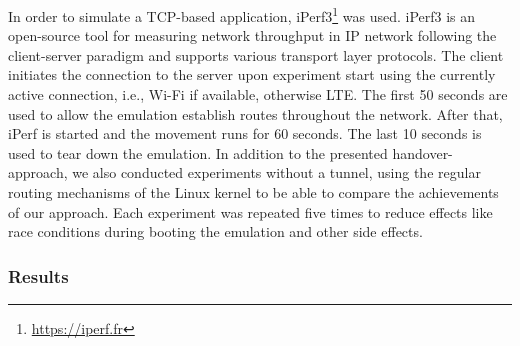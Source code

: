 In order to simulate a TCP-based application, iPerf3\footnote{\url{https://iperf.fr}} was used.
iPerf3 is an open-source tool for measuring network throughput in IP network following the client-server paradigm and supports various transport layer protocols.
The client initiates the connection to the server upon experiment start using the currently active connection, i.e., Wi-Fi if available, otherwise LTE.
The first 50 seconds are used to allow the emulation establish routes throughout the network.%
After that, iPerf is started and the movement runs for 60 seconds.
The last 10 seconds is used to tear down the emulation.
In addition to the presented handover-approach, we also conducted experiments without a tunnel, using the regular routing mechanisms of the Linux kernel to be able to compare the achievements of our approach.
Each experiment was repeated five times to reduce effects like race conditions during booting the emulation and other side effects.

\subsubsection{Results}

